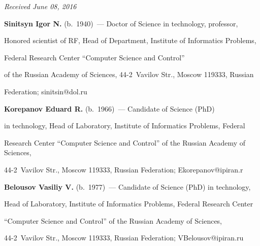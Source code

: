 \vspace*{-3pt}



\hfill{\small\textit{Received June 08, 2016}}





\Contr



\noindent

\textbf{Sinitsyn Igor N.} (b.\ 1940)~--- Doctor of Science in technology, professor, 

Honored scientist of RF, Head of Department, Institute of Informatics Problems, 

Federal Research Center ``Computer Science and Control'' 

of the Russian Academy of Sciences, 44-2~Vavilov Str., Moscow 119333, Russian 

Federation; \mbox{sinitsin@dol.ru}



\vspace*{3pt}





\noindent

\textbf{Korepanov Eduard R.} (b.\ 1966)~--- Candidate of Science (PhD) 

in technology, Head of Laboratory, Institute of Informatics Problems, Federal 

Research Center ``Computer Science and Control'' of the Russian Academy of Sciences, 

44-2~Vavilov Str., Moscow 119333, Russian Federation; \mbox{Ekorepanov@ipiran.r}



\vspace*{3pt}





\noindent

\textbf{Belousov Vasiliy V.} (b.\ 1977)~--- Candidate of Science (PhD) in technology, 

Head of Laboratory, Institute of Informatics Problems, Federal Research Center 

``Computer Science and Control'' of the Russian Academy of Sciences, 

44-2~Vavilov Str., Moscow 119333, Russian Federation; \mbox{VBelousov@ipiran.ru} 

\label{end\stat}





\renewcommand{\bibname}{\protect\rm Литература}

